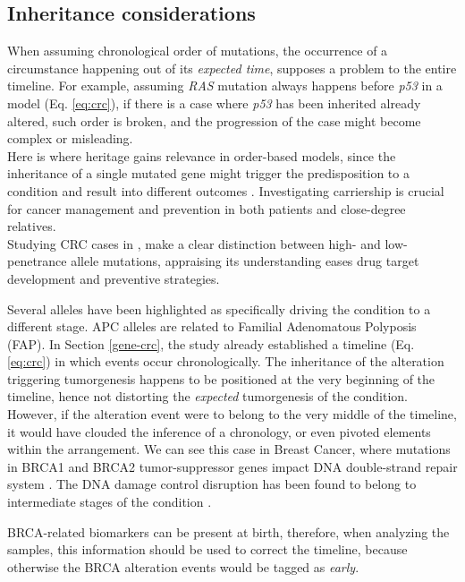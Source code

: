 \subsection{Inheritance considerations}
When assuming chronological order of mutations, the occurrence of a circumstance happening out of its \textit{expected time}, supposes a problem to the entire timeline. For example, assuming \textit{RAS} mutation always happens before \textit{p53} in a model (Eq. \ref{eq:crc}), if there is a case where \textit{p53} has been inherited already altered, such order is broken, and the progression of the case might become complex or misleading.
\\

Here is where heritage gains relevance in order-based models, since the inheritance of a single mutated gene might trigger the predisposition to a condition and result into different outcomes \cite{Kinzler1996LessonsCancer}.
Investigating carriership is crucial for cancer management and prevention in both patients and close-degree relatives.
\\

Studying CRC cases in \cite{DeLaChapelle2004GeneticCancer}, make a clear distinction between high- and low-penetrance allele mutations, appraising its understanding eases drug target development and preventive strategies. 

Several alleles have been highlighted as specifically driving the condition to a different stage. APC alleles are related to Familial Adenomatous Polyposis (FAP). In Section \ref{gene-crc}, the study \cite{Fearon1990ATumorigenesis} already established a timeline (Eq. \ref{eq:crc}) in which events occur chronologically. The inheritance of the alteration triggering tumorgenesis happens to be positioned at the very beginning of the timeline, hence not distorting the \textit{expected} tumorgenesis of the condition.
\\

However, if the alteration event were to belong to the very middle of the timeline, it would have clouded the inference of a chronology, or even pivoted elements within the arrangement. We can see this case in Breast Cancer, where mutations in BRCA1 and BRCA2 tumor-suppressor genes impact DNA double-strand repair system \cite{Turnbull2008GeneticFuture} \cite{Foulkes2003GermlineCancer} \cite{Mavaddat2013CancerEMBRACE}. The DNA damage control disruption has been found to belong to intermediate stages of the condition \cite{Gerstung2011TheTumorigenesis}.

BRCA-related biomarkers can be present at birth, therefore, when analyzing the samples, this information should be used to correct the timeline, because otherwise the BRCA alteration events would be tagged as \textit{early}.
